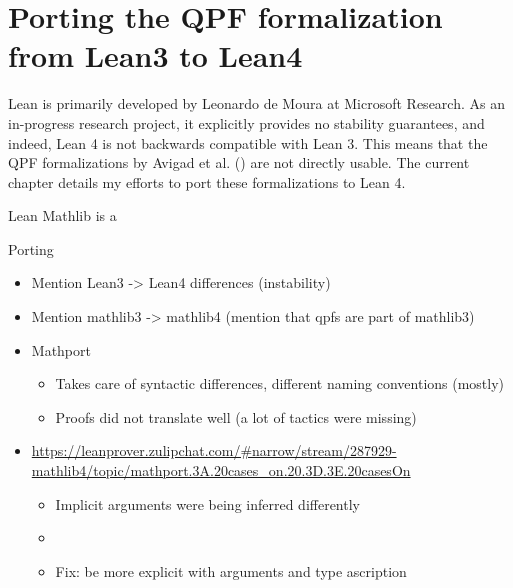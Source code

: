 
\chapter{Porting the QPF formalization from Lean3 to Lean4}
\label{ch:porting}

Lean is primarily developed by Leonardo de Moura at Microsoft Research. As an in-progress research project, it explicitly provides no stability guarantees, and indeed, Lean 4 is not backwards compatible with Lean 3.
This means that the QPF formalizations by Avigad et al.
(\cite{avigadDataTypesQuotients2019a}) are not directly usable. The current chapter details my efforts to port these formalizations to Lean 4.


Lean Mathlib is a 





\begin{todo}
    Porting
    \begin{itemize}
        \item Mention Lean3 -> Lean4 differences (instability)
        \item Mention mathlib3 -> mathlib4 (mention that qpfs are part of mathlib3)
        \item Mathport 
                \begin{itemize}
                    \item Takes care of syntactic differences, different naming conventions (mostly)
                    \item Proofs did not translate well (a lot of tactics were missing)
                \end{itemize}
        \item \url{https://leanprover.zulipchat.com/#narrow/stream/287929-mathlib4/topic/mathport.3A.20cases_on.20.3D.3E.20casesOn}
            \begin{itemize}
                \item Implicit  arguments were being inferred differently
                \item {}
                \item Fix: be more explicit with arguments and type ascription
            \end{itemize}
    \end{itemize}
\end{todo}